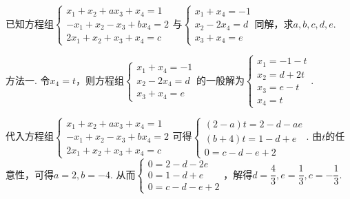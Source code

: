\begin{exercise}
\begin{exgroup}
        \item 已知方程组$\begin{cases}
                x_1+x_2+ax_3+x_4=1 \\ -x_1+x_2-x_3+bx_4=2 \\ 2x_1+x_2+x_3+x_4=c
            \end{cases}$与$\begin{cases}
                x_1+x_4=-1 \\ x_2-2x_4=d \\ x_3+x_4=e
            \end{cases}$同解，求$a,b,c,d,e$.
        \begin{answer}
            方法一. 令$x_4=t$，则方程组$\begin{cases}
                x_1+x_4=-1 \\
                x_2-2x_4=d \\
                x_3+x_4=e
            \end{cases}$的一般解为$\begin{cases}
                x_1=-1-t \\
                x_2=d+2t \\
                x_3=e-t  \\
                x_4=t
            \end{cases}$.

        代入方程组$\begin{cases}
                x_1+x_2+ax_3+x_4=1  \\
                -x_1+x_2-x_3+bx_4=2 \\
                2x_1+x_2+x_3+x_4=c
            \end{cases}$可得$\begin{cases}
                (2-a)t=2-d-ae \\
                (b+4)t=1-d+e  \\
                0=c-d-e+2
            \end{cases}$. 由$t$的任意性，可得$a=2,b=-4$. 从而$\begin{cases}
                0=2-d-2e \\
                0=1-d+e  \\
                0=c-d-e+2
            \end{cases}$，解得$d=\dfrac{4}{3},e=\dfrac{1}{3},c=-\dfrac{1}{3}$.


\end{answer}
\end{exgroup}
\end{exercise}
